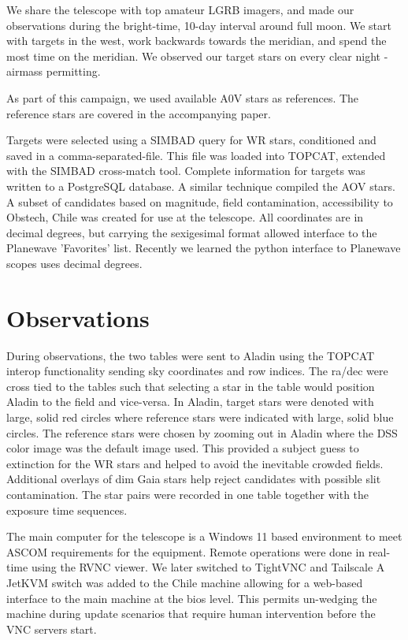 \documentclass[letter,11pt,oneside]{article}
\newcommand{\ltodo}[2]{\marginpar{\textcolor{red}{ACTION: #1}\endnote{#2}}}
\begin{document}
We share the telescope with top amateur LGRB imagers, and made our
observations during the bright-time, 10-day interval around full moon.
We start with targets in the west, work backwards towards the meridian,
and spend the most time on the meridian. We observed our target stars on
every clear night - airmass permitting.


As part of this campaign, we used available A0V stars as references. The
reference stars are covered in the accompanying paper. 

Targets were selected using a SIMBAD query for WR stars, conditioned
and saved in a comma-separated-file. This file was loaded into TOPCAT,
extended with the SIMBAD cross-match tool. Complete information for
targets was written to a PostgreSQL database. A similar technique
compiled the AOV stars. A subset of candidates based on magnitude,
field contamination, accessibility to Obstech, Chile was created
for use at the telescope. All coordinates are in decimal degrees,
but carrying the sexigesimal format allowed interface to the Planewave
'Favorites' list. Recently we learned the python interface to
Planewave scopes uses decimal degrees. 

\section{Observations}

During observations, the two tables were sent to Aladin using the
TOPCAT interop functionality sending sky coordinates and row
indices. The ra/dec were cross tied to the tables such that selecting
a star in the table would position Aladin to the field and
vice-versa. In Aladin, target stars were denoted with large, solid red
circles where reference stars were indicated with large, solid blue
circles. The reference stars were chosen by zooming out in Aladin
where the DSS color image was the default image used. This provided a
subject guess to extinction for the WR stars and helped to avoid the
inevitable crowded fields. Additional overlays of dim Gaia stars help
reject candidates with possible slit contamination. The star pairs
were recorded in one table together with the exposure time sequences.

The main computer for the telescope is a Windows 11 based environment
to meet ASCOM \cite{ASCOM2026} requirements for the equipment. Remote
operations were done in real-time using the RVNC viewer. We later
switched to TightVNC and Tailscale A JetKVM switch was added to the
Chile machine allowing for a web-based interface to the main machine
at the bios level. This permits un-wedging the machine during update
scenarios that require human intervention before the VNC servers start.
\end{document}

